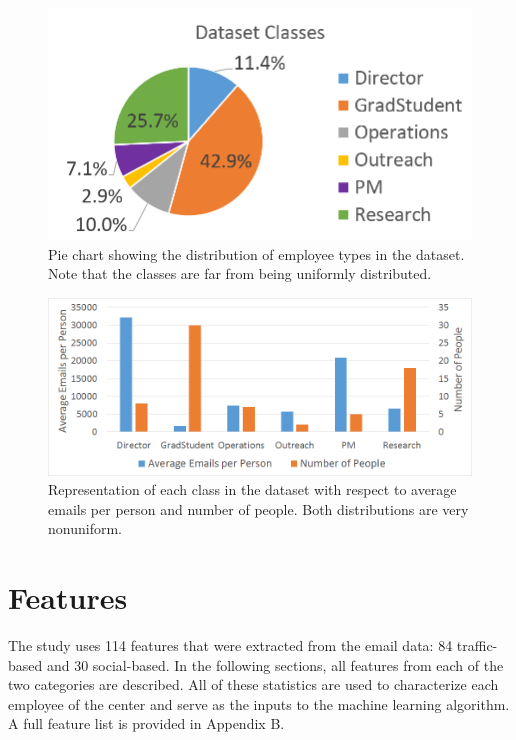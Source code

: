 \documentclass[12pt]{report}
\begin{document}
\begin{figure}[t]
    \centering
        \includegraphics[width=\columnwidth,trim={0mm 0mm 0mm 0mm},clip]{class_breakdown}
        \caption[Dataset class distribution]{Pie chart showing the distribution of employee types in the dataset.  Note that the classes are far from being uniformly distributed.}
        \label{fig:class_breakdown}
\end{figure}


\begin{figure}[t]
	\centering
	\includegraphics[width=\columnwidth,trim={2mm 2mm 2mm 2mm},clip]{DB_Stats_bar}
	\caption[Emails per person per job title]{Representation of each class in the dataset with respect to average emails per person and number of people.  Both distributions are very nonuniform.}
	\label{fig:db_bar}
\end{figure}


\section{Features} \label{sec:features}
The study uses 114 features that were extracted from the email data: 84 traffic-based and 30 social-based.
In the following sections, all features from each of the two categories are described. 
All of these statistics are used to characterize each employee of the center and serve as the inputs to the machine learning algorithm.
A full feature list is provided in Appendix B.
\end{document}
